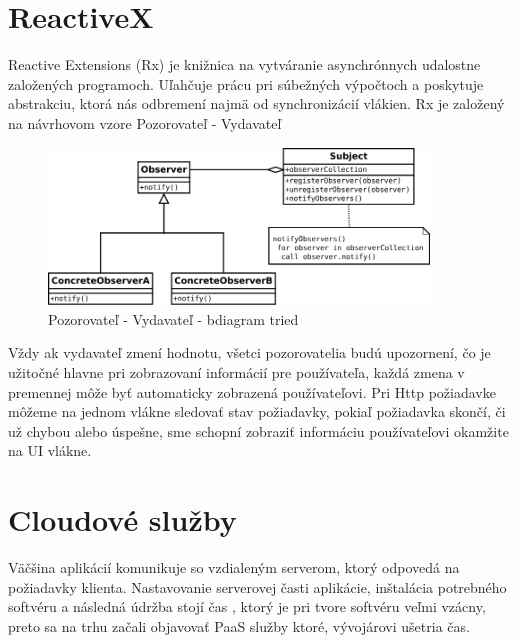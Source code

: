 \section{ReactiveX}

Reactive Extensions (Rx) je knižnica na vytváranie asynchrónnych udalostne založených programoch. Uľahčuje prácu pri súbežných výpočtoch a poskytuje abstrakciu, ktorá nás odbremení najmä od synchronizácií vlákien. Rx je založený na návrhovom vzore Pozorovateľ - Vydavateľ

\begin{figure}[H]
    \begin{center}
        \begin{minipage}{0.9\linewidth}
            \begin{center}
                \includegraphics[width=0.9\textwidth]{images/rx.png}
                \caption{Pozorovateľ - Vydavateľ - bdiagram tried }
                \label{obr2.1}
            \end{center}
        \end{minipage}
    \end{center}
\end{figure}

Vždy ak vydavateľ zmení hodnotu, všetci pozorovatelia budú upozornení, čo je užitočné hlavne pri zobrazovaní informácií pre používateľa, každá zmena v premennej môže byť automaticky zobrazená používateľovi. Pri Http požiadavke môžeme na jednom vlákne sledovať stav požiadavky, pokiaľ požiadavka skončí, či už chybou alebo úspešne, sme schopní zobraziť informáciu používateľovi okamžite na UI vlákne.

\section{Cloudové služby}

Väčšina aplikácií komunikuje so vzdialeným serverom, ktorý odpovedá na požiadavky klienta. Nastavovanie serverovej časti aplikácie, inštalácia potrebného softvéru  a následná údržba stojí čas , ktorý je pri tvore softvéru veľmi vzácny, preto sa na trhu začali objavovať PaaS služby ktoré, vývojárovi ušetria čas.

